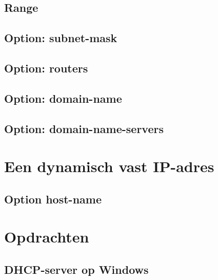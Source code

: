 \documentclass[a4paper,12pt,twoside,openright,titlepage]{book}
\begin{document}
\section{Range}

\section{Option: subnet-mask}

\section{Option: routers}

\section{Option: domain-name}

\section{Option: domain-name-servers}


\chapter{Een dynamisch vast IP-adres}

\section{Option host-name}


\chapter{Opdrachten}
\section{DHCP-server op Windows}


\backmatter
\printindex
\end{document}
